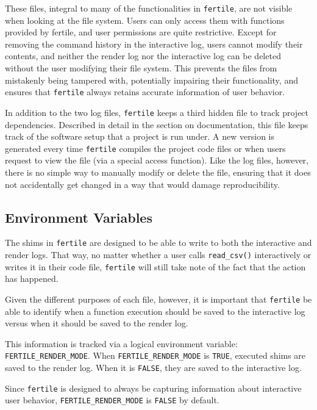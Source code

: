 \documentclass[12pt,twoside]{reedthesis}
\begin{document}
These files, integral to many of the functionalities in
\texttt{fertile}, are not visible when looking at the file system. Users
can only access them with functions provided by fertile, and user
permissions are quite restrictive. Except for removing the command
history in the interactive log, users cannot modify their contents, and
neither the render log nor the interactive log can be deleted without
the user modifying their file system. This prevents the files from
mistakenly being tampered with, potentially impairing their
functionality, and ensures that \texttt{fertile} always retains accurate
information of user behavior.

In addition to the two log files, \texttt{fertile} keeps a third hidden
file to track project dependencies. Described in detail in the section
on documentation, this file keeps track of the software setup that a
project is run under. A new version is generated every time
\texttt{fertile} compiles the project code files or when users request
to view the file (via a special access function). Like the log files,
however, there is no simple way to manually modify or delete the file,
ensuring that it does not accidentally get changed in a way that would
damage reproducibility.

\subsection{Environment Variables}\label{environment-variables}

The shims in \texttt{fertile} are designed to be able to write to both
the interactive and render logs. That way, no matter whether a user
calls \texttt{read\_csv()} interactively or writes it in their code
file, \texttt{fertile} will still take note of the fact that the action
has happened.

Given the different purposes of each file, however, it is important that
\texttt{fertile} be able to identify when a function execution should be
saved to the interactive log versus when it should be saved to the
render log.

This information is tracked via a logical environment variable:
\texttt{FERTILE\_RENDER\_MODE}. When \texttt{FERTILE\_RENDER\_MODE} is
\texttt{TRUE}, executed shims are saved to the render log. When it is
\texttt{FALSE}, they are saved to the interactive log.

Since \texttt{fertile} is designed to always be capturing information
about interactive user behavior, \texttt{FERTILE\_RENDER\_MODE} is
\texttt{FALSE} by default.
\end{document}
